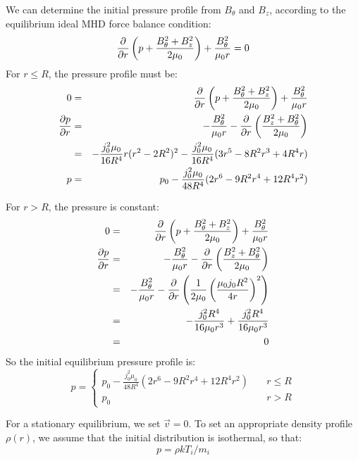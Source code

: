 \documentclass[%
 reprint,
 amsmath,amssymb,
 aps,
]{revtex4-2}
\begin{document}
We can determine the initial pressure profile from $B_\theta$ and $B_z$, according to the equilibrium ideal MHD force balance condition:
\begin{equation}
\pdv{}{r} \left( p + \frac{B_\theta ^2 + B_z ^2}{2 \mu_0} \right) + \frac{B_\theta ^2}{\mu_0 r} = 0
\end{equation}
For $r \leq R$, the pressure profile must be:
\begin{eqnarray}
0 & = & \pdv{}{r} \left( p + \frac{B_\theta ^2 + B_z ^2}{2 \mu_0} \right) + \frac{B_\theta ^2}{\mu_0 r} \\
\pdv{p}{r} & = & - \frac{B_\theta ^2}{\mu_0 r} - \pdv{}{r} \left( \frac{B_z ^2 + B_\theta ^2}{2 \mu_0} \right ) \\
 & = & - \frac{j_0 ^2 \mu_0}{16 R^4}r (r^2 - 2R^2)^2 - \frac{j_0 ^2 \mu_0}{16 R^4} (3 r^5 - 8R^2 r^3 + 4 R^4 r) \\
p & = & p_0 - \frac{j_0 ^2 \mu_0}{48 R^4} (2 r^6 - 9 R^2 r^4 + 12 R^4 r^2)
\end{eqnarray}

For $r > R$, the pressure is constant:
\begin{eqnarray}
0 & = & \pdv{}{r} \left( p + \frac{B_\theta ^2 + B_z ^2}{2 \mu_0} \right) + \frac{B_\theta ^2}{\mu_0 r} \\
\pdv{p}{r} & = & - \frac{B_\theta ^2}{\mu_0 r} - \pdv{}{r} \left( \frac{B_z ^2 + B_\theta ^2}{2 \mu_0} \right ) \\
& = & - \frac{B_\theta ^2}{\mu_0 r} - \pdv{}{r} \left( \frac{1}{2 \mu_0} \left(\frac{\mu_0 j_0 R^2}{4 r} \right)^2 \right) \\
& = & - \frac{j_0 ^2 R^4}{16 \mu_0 r^3} + \frac{j_0 ^2 R^4}{16 \mu_0 r^3} \\
& = & 0
\end{eqnarray}
So the initial equilibrium pressure profile is:
\begin{equation}
p = \begin{cases} p_0 - \frac{j_0 ^2 \mu_0}{48 R^4} (2 r^6 - 9 R^2 r^4 + 12 R^4 r^2) & \quad r \leq R \\ p_0 & \quad r > R\end{cases}
\end{equation}

For a stationary equilibrium, we set $\vec v = 0$. To set an appropriate density profile $\rho(r)$, we assume that the initial distribution is isothermal, so that:
\begin{equation}
p = \rho k T_i / m_i
\end{equation}
\end{document}
